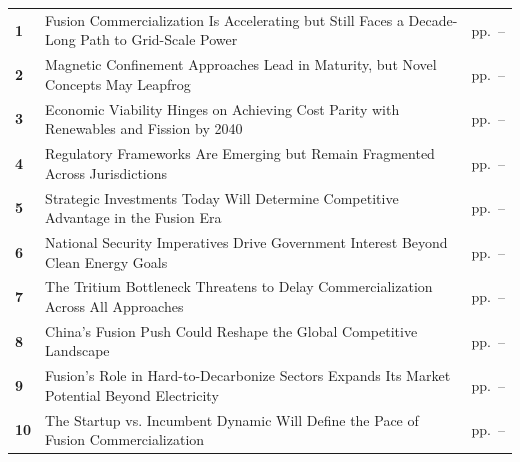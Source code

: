 \documentclass[10pt,a4paper]{article}
\begin{document}
\begin{tabularx}{\linewidth}{p{8mm}Yp{29mm}}
\textcolor{BOBlue}{\bfseries 1} & Fusion Commercialization Is Accelerating but Still Faces a Decade-Long Path to Grid-Scale Power & {\color{BOMuted}pp.~\pageref{chap:1}--\pageref{chap:1:end}} \\[3pt]
\textcolor{BOBlue}{\bfseries 2} & Magnetic Confinement Approaches Lead in Maturity, but Novel Concepts May Leapfrog & {\color{BOMuted}pp.~\pageref{chap:2}--\pageref{chap:2:end}} \\[3pt]
\textcolor{BOBlue}{\bfseries 3} & Economic Viability Hinges on Achieving Cost Parity with Renewables and Fission by 2040 & {\color{BOMuted}pp.~\pageref{chap:3}--\pageref{chap:3:end}} \\[3pt]
\textcolor{BOBlue}{\bfseries 4} & Regulatory Frameworks Are Emerging but Remain Fragmented Across Jurisdictions & {\color{BOMuted}pp.~\pageref{chap:4}--\pageref{chap:4:end}} \\[3pt]
\textcolor{BOBlue}{\bfseries 5} & Strategic Investments Today Will Determine Competitive Advantage in the Fusion Era & {\color{BOMuted}pp.~\pageref{chap:5}--\pageref{chap:5:end}} \\[3pt]
\textcolor{BOBlue}{\bfseries 6} & National Security Imperatives Drive Government Interest Beyond Clean Energy Goals & {\color{BOMuted}pp.~\pageref{chap:6}--\pageref{chap:6:end}} \\[3pt]
\textcolor{BOBlue}{\bfseries 7} & The Tritium Bottleneck Threatens to Delay Commercialization Across All Approaches & {\color{BOMuted}pp.~\pageref{chap:7}--\pageref{chap:7:end}} \\[3pt]
\textcolor{BOBlue}{\bfseries 8} & China's Fusion Push Could Reshape the Global Competitive Landscape & {\color{BOMuted}pp.~\pageref{chap:8}--\pageref{chap:8:end}} \\[3pt]
\textcolor{BOBlue}{\bfseries 9} & Fusion's Role in Hard-to-Decarbonize Sectors Expands Its Market Potential Beyond Electricity & {\color{BOMuted}pp.~\pageref{chap:9}--\pageref{chap:9:end}} \\[3pt]
\textcolor{BOBlue}{\bfseries 10} & The Startup vs. Incumbent Dynamic Will Define the Pace of Fusion Commercialization & {\color{BOMuted}pp.~\pageref{chap:10}--\pageref{chap:10:end}} \\[3pt]
\end{tabularx}
\clearpage
\end{document}
